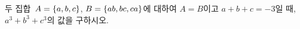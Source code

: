 두 집합~$A=\{a{,}\mkern3mu\mathopen{}b{,}\mkern3mu\mathopen{}c\}$, $B=\{ab{,}\mkern3mu\mathopen{}bc{,}\mkern3mu\mathopen{}ca\}$에 대하여 $A=B$이고 $a+b+c=-3$일 때, $a^3+b^3+c^3$의 값을 구하시오. 
